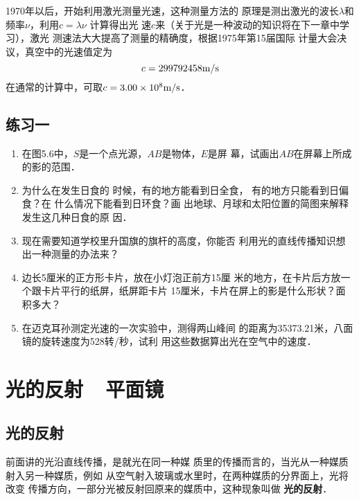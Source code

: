 1970年以后，开始利用激光测量光速，这种测量方法的
原理是测出激光的波长$\lambda$和频率$\nu$，利用$c=\lambda\nu$ 计算得出光
速$c$来（关于光是一种波动的知识将在下一章中学习），激光
测速法大大提高了测量的精确度，根据1975年第15届国际
计量大会决议，真空中的光速值定为
$$c=299792458\text{m}/\text{s}$$
在通常的计算中，可取$c=3.00\times10^8\text{m}/\text{s}$．

\subsection*{练习一}
\begin{enumerate}
    \item 在图5.6中，$S$是一个点光源，$AB$是物体，$E$是屏
幕，试画出$AB$在屏幕上所成
的影的范围．
\begin{figure}[htp]
	\centering
{}
	\caption{}
\end{figure}


\item 为什么在发生日食的
时候，有的地方能看到日全食，
有的地方只能看到日偏食？在
什么情况下能看到日环食？画
出地球、月球和太阳位置的简图来解释发生这几种日食的原
因．
\item 现在需要知道学校里升国旗的旗杆的高度，你能否
利用光的直线传播知识想出一种测量的办法来？
\item 边长5厘米的正方形卡片，放在小灯泡正前方15厘
米的地方，在卡片后方放一个跟卡片平行的纸屏，纸屏距卡片
15厘米，卡片在屏上的影是什么形状？面积多大？
\item 在迈克耳孙测定光速的一次实验中，测得两山峰间
的距离为35373.21米，八面镜的旋转速度为528转/秒，试利
用这些数据算出光在空气中的速度．
\end{enumerate}

\section{光的反射~~平面镜}
\subsection{光的反射}
前面讲的光沿直线传播，是就光在同一种媒
质里的传播而言的，当光从一种媒质射入另一种媒质，例如
从空气射入玻璃或水里时，在两种媒质的分界面上，光将改变
传播方向，一部分光被反射回原来的媒质中，这种现象叫做
\textbf{光的反射}．

